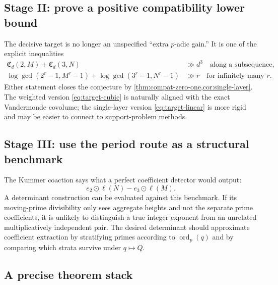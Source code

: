 \documentclass[11pt]{article}
\theoremstyle{definition}
\theoremstyle{remark}
\newcommand{\ord}{\operatorname{ord}}
\begin{document}
\subsection{Stage II: prove a positive compatibility lower bound}

The decisive target is no longer an unspecified ``extra $p$-adic gain.''  It
is one of the explicit inequalities
\begin{align}
 \mathfrak C_d(2,M)+\mathfrak C_d(3,N)&\gg d^3
 \quad\text{along a subsequence},\label{eq:target-cubic}\\
 \log\gcd(2^r-1,M^r-1)+\log\gcd(3^r-1,N^r-1)&\gg r
 \quad\text{for infinitely many }r.\label{eq:target-linear}
\end{align}
Either statement closes the conjecture by
\cref{thm:compat-zero-one,cor:single-layer}.  The weighted version
\eqref{eq:target-cubic} is naturally aligned with the exact Vandermonde
covolume; the single-layer version \eqref{eq:target-linear} is more rigid and
may be easier to connect to support-problem methods.

\subsection{Stage III: use the period route as a structural benchmark}

The Kummer coaction says what a perfect coefficient detector would output:
\[
 e_2\odot\ell(N)-e_3\odot\ell(M).
\]
A determinant construction can be evaluated against this benchmark.  If its
moving-prime divisibility only sees aggregate heights and not the separate
prime coefficients, it is unlikely to distinguish a true integer exponent
from an unrelated multiplicatively independent pair.  The desired determinant
should approximate coefficient extraction by stratifying primes according to
$\ord_p(q)$ and by comparing which strata survive under $q\mapsto Q$.

\subsection{A precise theorem stack}
\end{document}
